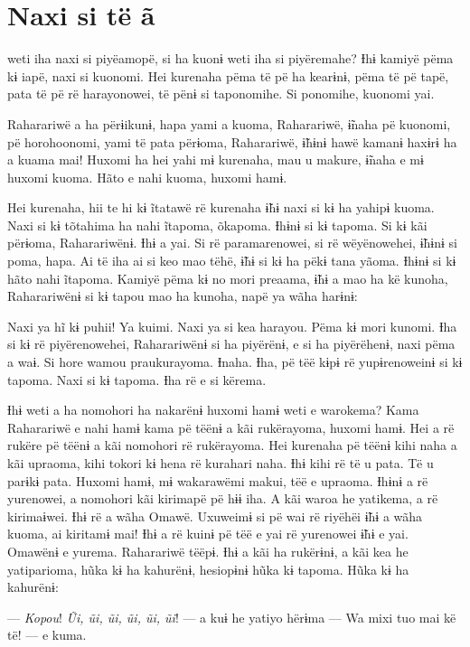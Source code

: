 \chapter{Naxi si të ã}

 weti iha naxi si piyëamopë, si ha kuonɨ weti iha si piyëremahe? Ɨhɨ
kamiyë pëma kɨ iapë, naxi si kuonomi. Hei kurenaha pëma të pë ha
kearɨnɨ, pëma të pë tapë, pata të pë rë harayonowei, të pënɨ si
taponomihe. Si ponomihe, kuonomi yai.

Raharariwë a ha përɨikunɨ, hapa yami a kuoma, Raharariwë, ɨ̃naha pë
kuonomi, pë horohoonomi, yami të pata përɨoma, Raharariwë, ɨ̃hɨnɨ hawë
kamanɨ haxɨrɨ ha a kuama mai! Huxomi ha hei yahi mɨ kurenaha, mau u
makure, ɨ̃naha e mɨ huxomi kuoma. Hãto e nahi kuoma, huxomi hamɨ. 

Hei kurenaha, hii te hi kɨ ĩtatawë rë kurenaha ɨ̃hɨ naxi si kɨ ha yahipɨ
 kuoma. Naxi si kɨ tõtahima ha nahi ĩtapoma, õkapoma. Ɨhɨnɨ si kɨ tapoma.
 Si kɨ kãi përɨoma, Raharariwënɨ. Ɨhɨ a yai. Si rë paramarenowei, si rë
 wëyënowehei, ɨ̃hɨnɨ si poma, hapa. Ai të iha ai si keo mao tëhë, ɨ̃hɨ si
 kɨ ha pëkɨ tana yãoma. Ɨhɨnɨ si kɨ hãto nahi ĩtapoma. Kamiyë pëma kɨ no
 mori preaama, ɨ̃hɨ a mao ha kë kunoha, Raharariwënɨ si kɨ tapou mao ha
 kunoha, napë ya wãha harɨnɨ: 

Naxi ya hĩ kɨ puhii! Ya kuimi. Naxi ya si kea harayou. Pëma kɨ mori
kunomi. Ɨha si kɨ rë piyërenowehei, Raharariwënɨ si ha piyërënɨ, e si ha
piyërëhenɨ, naxi pëma a waɨ. Si hore wamou praukurayoma. Ɨnaha. Ɨha, pë
tëë kɨpɨ rë yupɨrenoweinɨ si kɨ tapoma. Naxi si kɨ tapoma. Ɨha rë e si
kërema. 

Ɨhɨ weti a ha nomohori ha nakarënɨ huxomi hamɨ weti e warokema? Kama
 Raharariwë e nahi hamɨ kama pë tëënɨ a kãi rukërayoma, huxomi hamɨ. Hei
 a rë rukëre pë tëënɨ a kãi nomohori rë rukërayoma. Hei kurenaha pë tëënɨ
 kihi naha a kãi upraoma, kihi tokori kɨ hena rë kurahari naha. Ɨhɨ kihi
 rë të u pata. Të u parɨkɨ pata. Huxomi hamɨ, mɨ wakarawëmi makui, tëë e
 upraoma. Ɨhɨnɨ a rë yurenowei, a nomohori kãi kirimapë pë hɨɨ iha. A kãi
 waroa he yatikema, a rë kirimaɨwei. Ɨhɨ rë a wãha Omawë. Uxuweimɨ si pë
 wai rë riyëhëi ɨ̃hɨ a wãha kuoma, ai kiritamɨ mai! Ɨhɨ a rë kuinɨ pë tëë
 e yai rë yurenowei ɨ̃hɨ e yai. Omawënɨ e yurema. Raharariwë tëëpɨ. Ɨhɨ a
 kãi ha rukërɨnɨ, a kãi kea he yatiparioma, hũka kɨ ha kahurënɨ,
 hesiopɨnɨ hũka kɨ tapoma. Hũka kɨ ha kahurënɨ: 

--- \textit{Kopou}! \textit{Ũi, ũi, ũi, ũi, ũi, ũi}! --- a kuɨ he yatiyo hërɨma --- Wa mixi
tuo mai kë të! --- e kuma. 

